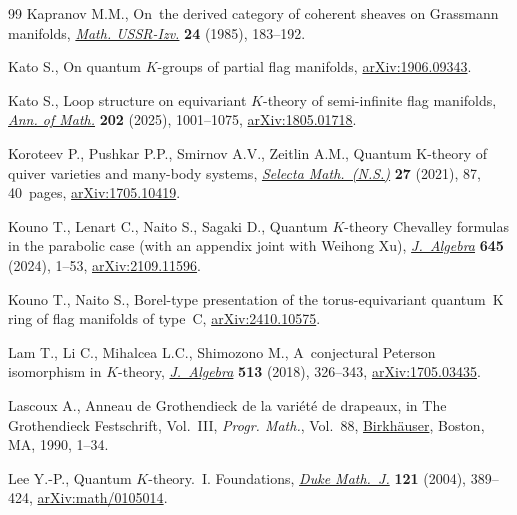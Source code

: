 \documentclass[pdftex]{sigma}
\numberwithin{equation}{section}
\theoremstyle{definition}
\begin{document}
\begin{thebibliography}{99}
Kapranov M.M., On~the derived category of coherent sheaves on Grassmann
 manifolds,
 \href{https://doi.org/10.1070/IM1985v024n01ABEH00122}{\textit{Math.
 USSR-Izv.}} \textbf{24} (1985), 183--192.

Kato S., On quantum $K$-groups of partial flag manifolds,
 \href{http://arxiv.org/abs/1906.09343}{arXiv:1906.09343}.

Kato S., Loop structure on equivariant {$K$}-theory of semi-infinite flag
 manifolds, \href{https://doi.org/10.4007/annals.2025.202.3.2}{\textit{Ann. of
 Math.}} \textbf{202} (2025), 1001--1075,
 \href{http://arxiv.org/abs/1805.01718}{arXiv:1805.01718}.

Koroteev P., Pushkar P.P., Smirnov A.V., Zeitlin A.M., Quantum {K}-theory of
 quiver varieties and many-body systems,
 \href{https://doi.org/10.1007/s00029-021-00698-3}{\textit{Selecta
 Math.~(N.S.)}} \textbf{27} (2021), 87, 40~pages,
 \href{http://arxiv.org/abs/1705.10419}{arXiv:1705.10419}.

Kouno T., Lenart C., Naito S., Sagaki D., Quantum {$K$}-theory {C}hevalley
 formulas in the parabolic case (with an appendix joint with {W}eihong {X}u),
 \href{https://doi.org/10.1016/j.jalgebra.2024.01.026}{\textit{J.~Algebra}}
 \textbf{645} (2024), 1--53,
 \href{http://arxiv.org/abs/2109.11596}{arXiv:2109.11596}.

Kouno T., Naito S., {B}orel-type presentation of the torus-equivariant
 quantum~{K} ring of flag manifolds of type~{C},
 \href{http://arxiv.org/abs/2410.10575}{arXiv:2410.10575}.

Lam T., Li C., Mihalcea L.C., Shimozono M., A~conjectural {P}eterson
 isomorphism in {$K$}-theory,
 \href{https://doi.org/10.1016/j.jalgebra.2018.07.029}{\textit{J.~Algebra}}
 \textbf{513} (2018), 326--343,
 \href{http://arxiv.org/abs/1705.03435}{arXiv:1705.03435}.

Lascoux A., Anneau de {G}rothendieck de la vari\'et\'e de drapeaux, in The
 {G}rothendieck {F}estschrift, {V}ol.~{III}, \textit{Progr. Math.}, Vol.~88,
 \href{https://doi.org/10.1007/978-0-8176-4576-2_1}{Birkh\"auser}, Boston, MA,
 1990, 1--34.

Lee Y.-P., Quantum {$K$}-theory.~{I}. {F}oundations,
 \href{https://doi.org/10.1215/S0012-7094-04-12131-1}{\textit{Duke Math.~J.}}
 \textbf{121} (2004), 389--424,
 \href{http://arxiv.org/abs/math/0105014}{arXiv:math/0105014}.


\end{thebibliography}
\end{document}
